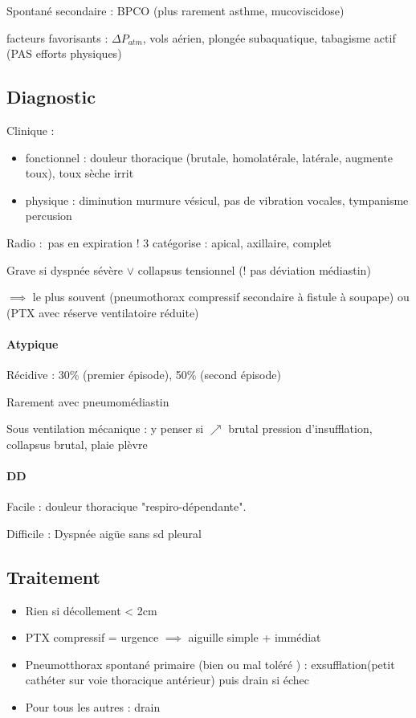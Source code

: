 \documentclass{article}
\begin{document}
Spontané secondaire : BPCO (plus rarement asthme, mucoviscidose)

facteurs favorisants : $\Delta P_{atm}$, vols aérien, plongée subaquatique,
tabagisme actif (PAS
efforts physiques)

\subsection{Diagnostic}
Clinique : 
\begin{itemize}
\item fonctionnel : douleur thoracique (brutale, homolatérale, latérale,
  augmente toux), toux sèche irrit
\item physique : diminution murmure vésicul, pas de vibration vocales,
  tympanisme percusion
\end{itemize}
Radio : pas en expiration ! 3 catégorise : apical, axillaire, complet

Grave si dyspnée sévère $\vee$ collapsus tensionnel (! pas déviation médiastin) 

$\implies$ le plus souvent (pneumothorax compressif secondaire à fistule à
soupape) ou (PTX avec réserve ventilatoire réduite)

\paragraph{Atypique}
Récidive : 30\% (premier épisode), 50\% (second épisode)

Rarement avec pneumomédiastin

Sous ventilation mécanique : y penser si $\nearrow$ brutal pression
d'insufflation, collapsus brutal, plaie plèvre

\paragraph{DD}
Facile : douleur thoracique "respiro-dépendante".

Difficile : Dyspnée aigüe sans sd pleural 

\subsection{Traitement}
\begin{itemize}
\item Rien si décollement < 2cm
\item PTX compressif = urgence $\implies$ aiguille simple + immédiat
\item Pneumotthorax spontané primaire (bien ou mal toléré ) :
  exsufflation(petit cathéter sur voie thoracique antérieur) puis drain
  si échec
\item Pour tous les autres : drain
\end{itemize}
\end{document}
